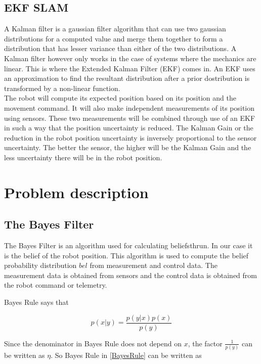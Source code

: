 \documentclass[conference]{IEEEtran}
\begin{document}
\subsection{EKF SLAM}
A Kalman filter is a gaussian filter algorithm that can use two gaussian distributions for a computed value and merge them together to form a distribution that has lesser variance than either of the two distributions. A Kalman filter however only works in the case of systems where the mechanics are linear. This is where the Extended Kalman Filter (EKF) comes in. An EKF uses an approximation to find the resultant distribution after a prior dostribution is transformed by a non-linear function.\\

The robot will compute its expected position based on its position and the movement command. It will also make independent measurements of its position using sensors. These two measurements will be combined through use of an EKF in such a way that the position uncertainty is reduced. The Kalman Gain or the reduction in the robot position uncertainty is inversely proportional to the sensor uncertainty. The better the sensor, the higher will be the Kalman Gain and the less uncertainty there will be in the robot position\cite{stachniss}.

\section{Problem description}
\subsection{The Bayes Filter}

The Bayes Filter is an algorithm used for calculating beliefs{thrun}. In our case it is the belief of the robot position. This algorithm is used to compute the belief probability distribution $bel$ from measurement and control data. The measurement data is obtained from sensors and the control data is obtained from the robot command or telemetry. 

Bayes Rule says that

\begin{equation}\label{BayesRule}
p(x|y) = \frac{p(y|x) p(x)}{p(y)}
\end{equation}

Since the denominator in Bayes Rule does not depend on $x$, the factor $\frac{1}{p(y)}$ can be written as $\eta$. So Bayes Rule in \ref{BayesRule} can be written as
\end{document}
